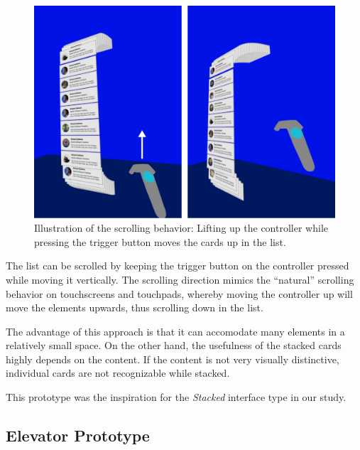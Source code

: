 \documentclass[nobib]{tufte-book} %
\begin{document}
\begin{figure}
  \includegraphics{emailscroll.png}
  \caption{Illustration of the scrolling behavior: Lifting up the controller while pressing the trigger button moves the cards up in the list.}
  \label{fig:emailscroll}
\end{figure}

The list can be scrolled by keeping the trigger button on the controller pressed while moving it vertically. The scrolling direction mimics the ``natural'' scrolling behavior on touchscreens and touchpads, whereby moving the controller up will move the elements upwards, thus scrolling down in the list.

The advantage of this approach is that it can accomodate many elements in a relatively small space. On the other hand, the usefulness of the stacked cards highly depends on the content. If the content is not very visually distinctive, individual cards are not recognizable while stacked.

This prototype was the inspiration for the \emph{Stacked} interface type in our study.

\subsection{Elevator Prototype}
\end{document}
